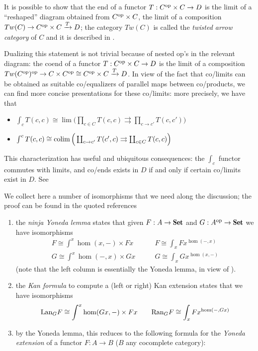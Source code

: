 \begin{remark}
It is possible to show that \cite{cofriend} the end of a functor $T : C^{\text{op}}\times C \to D$ is the limit of a ``reshaped'' diagram obtained from $C^{\text{op}}\times C$, \ie the limit of a composition $Tw(C)\to C^{\text{op}}\times C \xrightarrow{T}D$; the category $Tw(C)$ is called the \emph{twisted arrow category} of $C$ and it is described in \cite[???]{}.

Dualizing this statement is not trivial because of nested op's in the relevant diagram:  the coend of a functor $T : C^{\text{op}}\times C \to D$ is the limit of a composition $Tw(C^{\text{op}})^{\text{op}}\to C\times C^{\text{op}}\cong C^{\text{op}}\times C \xrightarrow{T}D$. In view of the fact that co/limits can be obtained as suitable co/equalizers of parallel maps between co/products, we can find more concise presentations for these co/limits: more precisely, we have that
\begin{itemize}
\item $\int_c T(c,c) \cong \lim \Big(\prod_{c\in C}T(c,c) \rightrightarrows \prod_{c\to c'}T(c,c')\Big)$
\item $\int^c T(c,c) \cong \operatorname*{colim}\Big(\coprod_{c\to c'}T(c',c) \rightrightarrows \coprod_{c\in C}T(c,c)\Big)$
\end{itemize}
This characterization has useful and ubiquitous consequences: the $\int_c$ functor commutes with limits, and co/ends exists in $D$ if and only if certain co/limits exist in $D$. See \cite[???]{cofriend}
\end{remark}
\begin{theorem}\label{a-few-isos}
We collect here a number of isomorphisms that we need along the discussion; the proof can be found in the quoted references
\begin{enumerate}[label=$\roman*$), ref=\roman*]
	\item \label{cofri.ninja}\cite[]{cofriend} the \emph{ninja Yoneda lemma} states that given $F : A\to \Set$ and $G : A^\opp\to \Set$ we have isomorphisms
	\begin{align*}
	F \cong \int^x \hom(x,-)\times Fx &\qquad F \cong \int_x Fx^{\hom(-,x)}\\
	G \cong \int^x \hom(-,x)\times Gx &\qquad G \cong \int_x Gx^{\hom(x,-)}
	\end{align*}
	(note that the left column is essentially the Yoneda lemma, in view of \cite[???]{McL}).
	\item \label{cofri.kan}\cite[]{cofriend} the \emph{Kan formula} to compute a (left or right) Kan extension states that we have isomorphisms
	\[ \text{Lan}_GF \cong \int^x \hom(Gx,-)\times Fx \qquad  \text{Ran}_GF \cong \int_x Fx^{\hom(-,Gx)} \]
	\item \label{cofri.yan} by the Yoneda lemma, this reduces to the following formula for the \emph{Yoneda extension} of a functor $F : A \to B$ ($B$ any cocomplete category):
	\[  \]
\end{enumerate}
\end{theorem}
